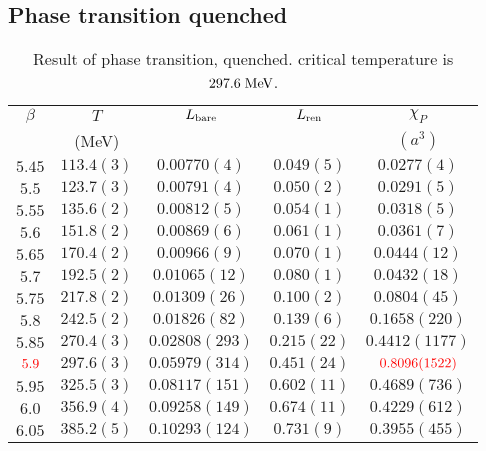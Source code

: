 \subsection{\label{resquench}Phase transition quenched}

\begin{table}
\begin{center}
\begin{tabular}{c|c|c|c|c}
    \hline    
$\beta$ & $T$ & $L_{\rm bare}$ & $L_{\rm ren}$ & $\chi _P$\\
& (MeV) & & & $(a^3)$ \\
\hline
$5.45$ & $113.4(3)$ & $0.00770(4)$   & $0.049(5)$  & $0.0277(4)$ \\
\hline
$5.5$  & $123.7(3)$ & $0.00791(4)$   & $0.050(2)$  & $0.0291(5)$ \\
\hline
$5.55$ & $135.6(2)$ & $0.00812(5)$   & $0.054(1)$  & $0.0318(5)$ \\
\hline
$5.6$  & $151.8(2)$ & $0.00869(6)$   & $0.061(1)$  & $0.0361(7)$ \\
\hline
$5.65$ & $170.4(2)$ & $0.00966(9)$   & $0.070(1)$  & $0.0444(12)$ \\ 
\hline
$5.7$  & $192.5(2)$ & $0.01065(12)$  & $0.080(1)$  & $0.0432(18)$ \\
\hline
$5.75$ & $217.8(2)$ & $0.01309(26)$  & $0.100(2)$  & $0.0804(45)$ \\
\hline
$5.8$  & $242.5(2)$ & $0.01826(82)$  & $0.139(6)$  & $0.1658(220)$ \\
\hline
$5.85$ & $270.4(3)$ & $0.02808(293)$ & $0.215(22)$ & $0.4412(1177)$ \\
\hline
$\textcolor[rgb]{1,0,0}{5.9}$  & $297.6(3)$ & $0.05979(314)$ & $0.451(24)$ & $\textcolor[rgb]{1,0,0}{0.8096(1522)}$ \\
\hline
$5.95$ & $325.5(3)$ & $0.08117(151)$ & $0.602(11)$ & $0.4689(736)$ \\
\hline
$6.0$  & $356.9(4)$ & $0.09258(149)$ & $0.674(11)$ & $0.4229(612)$ \\
\hline
$6.05$ & $385.2(5)$ & $0.10293(124)$ & $0.731(9)$  & $0.3955(455)$ \\
\hline
\end{tabular}
\caption{\label{tab.res.quenchphasetransition}Result of phase transition, quenched. critical temperature is $297.6\;{\rm MeV}$.}
\end{center}
\end{table}

